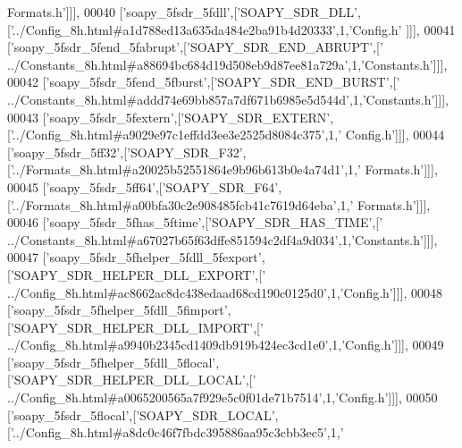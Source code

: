 \begin{DoxyCode}
{      Formats.h'}]]],
00040   [\textcolor{stringliteral}{'soapy\_5fsdr\_5fdll'},[\textcolor{stringliteral}{'SOAPY\_SDR\_DLL'},[\textcolor{stringliteral}{'../Config\_8h.html#a1d788ed13a635da484e2ba91b4d20333'},1,\textcolor{stringliteral}{'Config.h'}
      ]]],
00041   [\textcolor{stringliteral}{'soapy\_5fsdr\_5fend\_5fabrupt'},[\textcolor{stringliteral}{'SOAPY\_SDR\_END\_ABRUPT'},[\textcolor{stringliteral}{'
      ../Constants\_8h.html#a88694bc684d19d508eb9d87ee81a729a'},1,\textcolor{stringliteral}{'Constants.h'}]]],
00042   [\textcolor{stringliteral}{'soapy\_5fsdr\_5fend\_5fburst'},[\textcolor{stringliteral}{'SOAPY\_SDR\_END\_BURST'},[\textcolor{stringliteral}{'
      ../Constants\_8h.html#addd74e69bb857a7df671b6985e5d544d'},1,\textcolor{stringliteral}{'Constants.h'}]]],
00043   [\textcolor{stringliteral}{'soapy\_5fsdr\_5fextern'},[\textcolor{stringliteral}{'SOAPY\_SDR\_EXTERN'},[\textcolor{stringliteral}{'../Config\_8h.html#a9029e97c1effdd3ee3e2525d8084c375'},1,\textcolor{stringliteral}{'
      Config.h'}]]],
00044   [\textcolor{stringliteral}{'soapy\_5fsdr\_5ff32'},[\textcolor{stringliteral}{'SOAPY\_SDR\_F32'},[\textcolor{stringliteral}{'../Formats\_8h.html#a20025b52551864e9b96b613b0e4a74d1'},1,\textcolor{stringliteral}{'
      Formats.h'}]]],
00045   [\textcolor{stringliteral}{'soapy\_5fsdr\_5ff64'},[\textcolor{stringliteral}{'SOAPY\_SDR\_F64'},[\textcolor{stringliteral}{'../Formats\_8h.html#a00bfa30c2e908485fcb41c7619d64eba'},1,\textcolor{stringliteral}{'
      Formats.h'}]]],
00046   [\textcolor{stringliteral}{'soapy\_5fsdr\_5fhas\_5ftime'},[\textcolor{stringliteral}{'SOAPY\_SDR\_HAS\_TIME'},[\textcolor{stringliteral}{'
      ../Constants\_8h.html#a67027b65f63dffe851594c2df4a9d034'},1,\textcolor{stringliteral}{'Constants.h'}]]],
00047   [\textcolor{stringliteral}{'soapy\_5fsdr\_5fhelper\_5fdll\_5fexport'},[\textcolor{stringliteral}{'SOAPY\_SDR\_HELPER\_DLL\_EXPORT'},[\textcolor{stringliteral}{'
      ../Config\_8h.html#ac8662ac8dc438edaad68cd190c0125d0'},1,\textcolor{stringliteral}{'Config.h'}]]],
00048   [\textcolor{stringliteral}{'soapy\_5fsdr\_5fhelper\_5fdll\_5fimport'},[\textcolor{stringliteral}{'SOAPY\_SDR\_HELPER\_DLL\_IMPORT'},[\textcolor{stringliteral}{'
      ../Config\_8h.html#a9940b2345cd1409db919b424ec3cd1e0'},1,\textcolor{stringliteral}{'Config.h'}]]],
00049   [\textcolor{stringliteral}{'soapy\_5fsdr\_5fhelper\_5fdll\_5flocal'},[\textcolor{stringliteral}{'SOAPY\_SDR\_HELPER\_DLL\_LOCAL'},[\textcolor{stringliteral}{'
      ../Config\_8h.html#a0065200565a7f929e5c0f01de71b7514'},1,\textcolor{stringliteral}{'Config.h'}]]],
00050   [\textcolor{stringliteral}{'soapy\_5fsdr\_5flocal'},[\textcolor{stringliteral}{'SOAPY\_SDR\_LOCAL'},[\textcolor{stringliteral}{'../Config\_8h.html#a8dc0c46f7fbdc395886aa95c3cbb3ec5'},1,\textcolor{stringliteral}{'
}
\end{DoxyCode}
